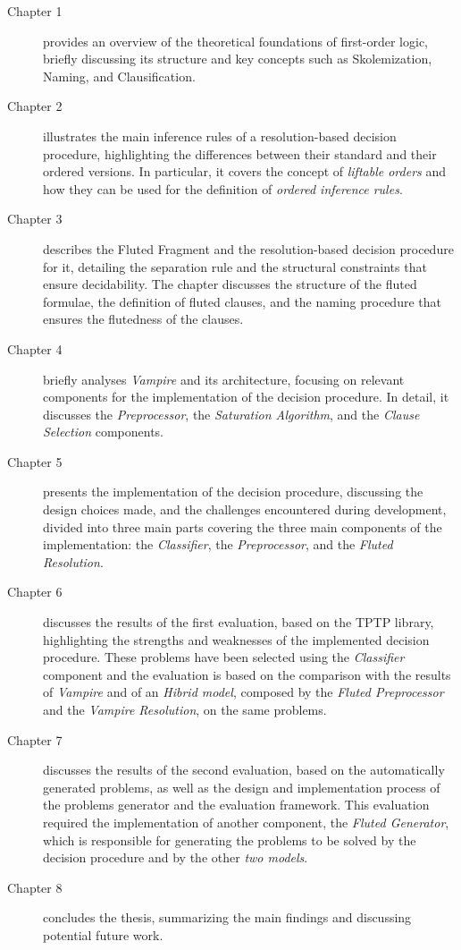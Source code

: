 \begin{description}
    \item[Chapter 1] provides an overview of the theoretical foundations of first-order logic, briefly discussing its structure and key concepts such as Skolemization, Naming, and Clausification.
    \item[Chapter 2] illustrates the main inference rules of a resolution-based decision procedure, highlighting the differences between their standard and their ordered versions. In particular, it covers the concept of \textit{liftable orders} and how they can be used for the definition of \textit{ordered inference rules}.
    \item[Chapter 3] describes the Fluted Fragment and the resolution-based decision procedure for it, detailing the separation rule and the structural constraints that ensure decidability. The chapter discusses the structure of the fluted formulae, the definition of fluted clauses, and the naming procedure that ensures the flutedness of the clauses.
    \item[Chapter 4] briefly analyses \textit{Vampire} and its architecture, focusing on relevant components for the implementation of the decision procedure. In detail, it discusses the \textit{Preprocessor}, the \textit{Saturation Algorithm}, and the \textit{Clause Selection} components.
    \item[Chapter 5] presents the implementation of the decision procedure, discussing the design choices made, and the challenges encountered during development, divided into three main parts covering the three main components of the implementation: the \textit{Classifier}, the \textit{Preprocessor}, and the \textit{Fluted Resolution}.
    \item[Chapter 6] discusses the results of the first evaluation, based on the TPTP library, highlighting the strengths and weaknesses of the implemented decision procedure. These problems have been selected using the \textit{Classifier} component and the evaluation is based on the comparison with the results of \textit{Vampire} and of an \textit{Hibrid model}, composed by the \textit{Fluted Preprocessor} and the \textit{Vampire Resolution}, on the same problems.
    \item[Chapter 7] discusses the results of the second evaluation, based on the automatically generated problems, as well as the design and implementation process of the problems generator and the evaluation framework. This evaluation required the implementation of another component, the \textit{Fluted Generator}, which is responsible for generating the problems to be solved by the decision procedure and by the other \textit{two models}.
    \item[Chapter 8] concludes the thesis, summarizing the main findings and discussing potential future work.
\end{description}



